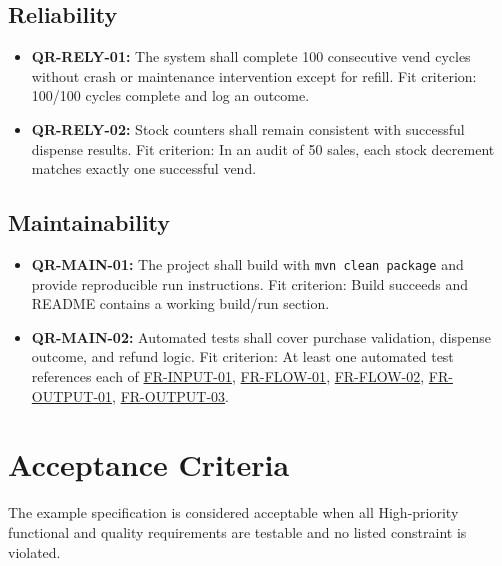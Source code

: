 \documentclass[a4paper,12pt]{article}
\newcommand{\reqref}[1]{\hyperlink{req:#1}{#1}}
\begin{document}
    \subsection{Reliability}
    \begin{itemize}
        \item \textbf{QR-RELY-01:} The system shall complete 100 consecutive vend cycles without crash or maintenance intervention except for refill.
        Fit criterion: 100/100 cycles complete and log an outcome.

        \item \textbf{QR-RELY-02:} Stock counters shall remain consistent with successful dispense results.
        Fit criterion: In an audit of 50 sales, each stock decrement matches exactly one successful vend.
    \end{itemize}

    \subsection{Maintainability}
    \begin{itemize}
        \item \textbf{QR-MAIN-01:} The project shall build with \texttt{mvn clean package} and provide reproducible run instructions.
        Fit criterion: Build succeeds and README contains a working build/run section.

        \item \textbf{QR-MAIN-02:} Automated tests shall cover purchase validation, dispense outcome, and refund logic.
        Fit criterion: At least one automated test references each of \reqref{FR-INPUT-01}, \reqref{FR-FLOW-01}, \reqref{FR-FLOW-02}, \reqref{FR-OUTPUT-01}, \reqref{FR-OUTPUT-03}.
    \end{itemize}


    \section{Acceptance Criteria}
    The example specification is considered acceptable when all High-priority functional and quality requirements are testable and no listed constraint is violated.
\end{document}
